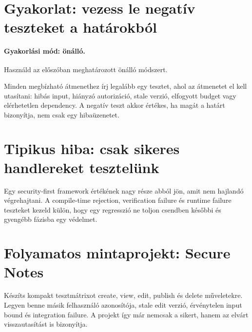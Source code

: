 \section{Gyakorlat: vezess le negatív teszteket a határokból}
\paragraph{Gyakorlási mód: önálló.} Használd az előszóban meghatározott önálló módszert.

Minden megbízható átmenethez írj legalább egy tesztet, ahol az átmenetet el kell utasítani: hibás input, hiányzó autorizáció, stale verzió, elfogyott budget vagy elérhetetlen dependency. A negatív teszt akkor értékes, ha magát a határt bizonyítja, nem csak egy hibaüzenetet.

\section{Tipikus hiba: csak sikeres handlereket tesztelünk}
Egy security-first framework értékének nagy része abból jön, amit nem hajlandó végrehajtani. A compile-time rejection, verification failure és runtime failure teszteket kezeld külön, hogy egy regresszió ne toljon csendben későbbi és gyengébb fázisba egy védelmet.

\section{Folyamatos mintaprojekt: Secure Notes}
Készíts kompakt tesztmátrixot create, view, edit, publish és delete műveletekre. Legyen benne másik felhasználó azonosítója, stale edit verzió, érvénytelen input bound és integration failure. A projekt így már nemcsak a sikert, hanem az elvárt visszautasítást is bizonyítja.
